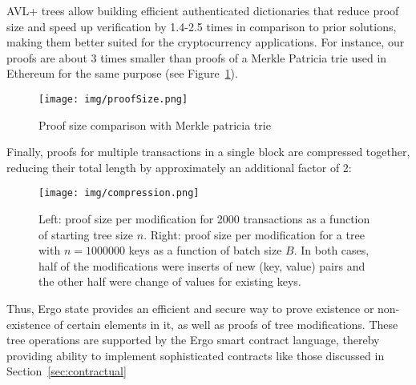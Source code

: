 AVL+ trees allow building efficient authenticated dictionaries that reduce proof size and speed up verification by 1.4-2.5 times in comparison to prior solutions, making them better suited for the cryptocurrency applications.
For instance, our proofs are about 3 times smaller than proofs of a Merkle Patricia trie used in Ethereum for the same purpose (see Figure~\ref{fig:proofSize}).


\begin{figure}[H]
    \centering
    \texttt{[image: img/proofSize.png]}
    \caption{Proof size comparison with Merkle patricia trie
    \label{fig:proofSize} }
\end{figure}

Finally, proofs for multiple transactions in a single block are compressed together, reducing their total length
by approximately an additional factor of 2:

\begin{figure}[H]
    \centering
    \texttt{[image: img/compression.png]}
    \caption{Left: proof size per modification for 2000 transactions as a function of starting tree size $n$.
    Right: proof size per modification for a tree with $n = 1 000 000$ keys as a function of batch size $B$.
    In both cases, half of the modifications were inserts of new (key, value) pairs and the other half were change of values for existing keys.
    \label{fig:compression} }
\end{figure}

Thus, Ergo state provides an efficient and secure way to prove existence or non-existence of certain elements in
it, as well as proofs of tree modifications.
These tree operations are supported by the Ergo smart contract language, thereby providing ability to implement sophisticated contracts like those discussed in Section~\ref{sec:contractual}





